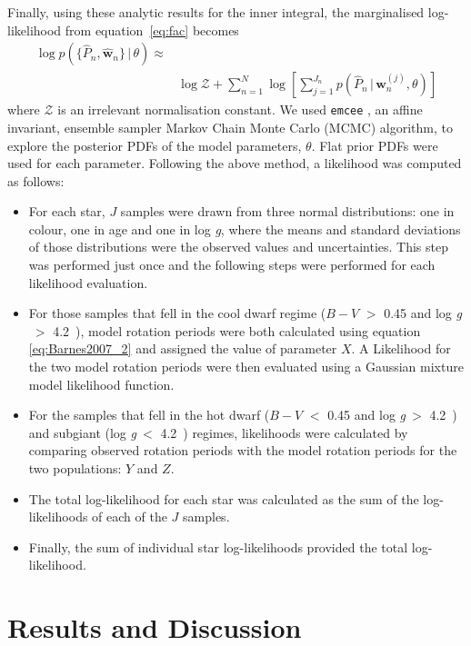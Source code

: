 \documentclass[useAMS, usenatbib]{mn2e}
\newcommand{\logg}{log \emph{g}}
\newcommand{\w}{\mathbf{w}}
\newcommand{\subcut}{4.2~}
\begin{document}
Finally, using these analytic results for the inner integral, the
marginalised log-likelihood from equation~\ref{eq:fac} becomes
\begin{eqnarray}
	\log p(\{\hat{P}_n,\hat{\w}_n\}\,|\,\theta) \approx & \\ \nonumber
    & \log \mathcal{Z} + \sum_{n=1}^N
	\log \left[ \sum_{j=1}^{J_n}p(\hat{P}_n\,|\,\mathbf{w}_n^{(j)},
\theta) \right ]
\end{eqnarray}
where $\mathcal{Z}$ is an irrelevant normalisation constant.
We used {\tt emcee} \citep{Foreman-Mackey2013}, an affine invariant, ensemble
sampler Markov Chain Monte Carlo (MCMC) algorithm, to explore the posterior
PDFs of the model parameters, $\theta$.
Flat prior PDFs were used for each parameter.
Following the above method, a likelihood was computed as follows:
\begin{itemize}
	\item For each star, $J$ samples were drawn from three normal
		distributions: one in colour, one in age and one in \logg,
		where the means and standard deviations of those distributions
		were the observed values and uncertainties.
		This step was performed just once and the
		following steps were performed for each likelihood evaluation.
	\item For those samples that fell in the cool dwarf regime
		($B-V$ $>$ 0.45 and \logg$~>$ \subcut), model rotation
		periods were both calculated using equation
		\ref{eq:Barnes2007_2} and assigned the value of parameter $X$.
		A Likelihood for the two model rotation periods were then
		evaluated using a Gaussian mixture model
		likelihood function.
	\item For the samples that fell in the hot dwarf ($B-V$ $<$ 0.45 and
		\logg$~>$ \subcut) and subgiant (\logg$~<$ \subcut) regimes,
		likelihoods were calculated by comparing observed rotation
		periods with the model rotation periods for the two
		populations: $Y$ and $Z$.
	\item The total log-likelihood for each star was calculated as the
		sum of the log-likelihoods of each of the $J$ samples.
	\item Finally, the sum of individual star log-likelihoods
		provided the total log-likelihood.
\end{itemize}

\section{Results and Discussion}
\label{sec:results}
\end{document}
